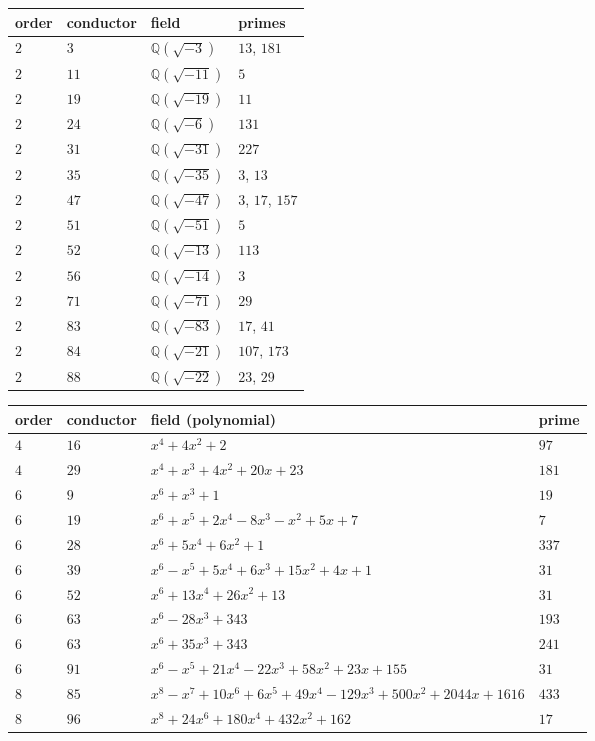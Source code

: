 \documentclass[pdflatex,sn-mathphys-num]{sn-jnl}%
\theoremstyle{plain}
\theoremstyle{definition}
\theoremstyle{remark}
\numberwithin{equation}{section}
\newcommand{\QQ}{\mathbb{Q}}
\begin{document}
\noindent \begin{tabular}{|l|l|l|l|} \hline
order & conductor & field & primes  \\ \hline
$2$ & $3$ & $\QQ(\sqrt{-3})$ & $13 $, $181$ \\ \hline
$2$ & $11$ & $\QQ(\sqrt{-11})$ & $5 $  \\ \hline
$2$ & $19$ & $\QQ(\sqrt{-19})$ & $11 $  \\ \hline
$2$ & $24$ & $\QQ(\sqrt{-6})$ & $131 $  \\ \hline
$2$ & $31$ & $\QQ(\sqrt{-31})$ & $227 $  \\ \hline
$2$ & $35$ & $\QQ(\sqrt{-35})$ & $3$, $13$  \\ \hline
$2$ & $47$ & $\QQ(\sqrt{-47})$ & $3$, $17$, $157$  \\ \hline
$2$ & $51$ & $\QQ(\sqrt{-51})$ & $5 $  \\ \hline
$2$ & $52$ & $\QQ(\sqrt{-13})$ & $113 $  \\ \hline
$2$ & $56$ & $\QQ(\sqrt{-14})$ & $3 $  \\ \hline
$2$ & $71$ & $\QQ(\sqrt{-71})$ & $29 $  \\ \hline
$2$ & $83$ & $\QQ(\sqrt{-83})$ & $17 $, $41$  \\ \hline
$2$ & $84$ & $\QQ(\sqrt{-21})$ & $107 $, $173$  \\ \hline
$2$ & $88$ & $\QQ(\sqrt{-22})$ & $23$, $29$  \\ \hline

\end{tabular}

\bigskip

\noindent \begin{tabular}{|l|l|l|l|} \hline
order & conductor & field (polynomial) & prime\\ \hline
$4$ & $16$ & $x^4 + 4 x^2 + 2$ & $97 $ \\ \hline
$4$ & $29$ & $x^4 + x^3 + 4 x^2 + 20 x + 23$ & $181 $  \\ \hline
\hline
$6$ & $9$ & $x^6 + x^3 + 1$ & $19 $  \\ \hline
$6$ & $19$ & $x^6 + x^5 + 2 x^4 - 8 x^3 - x^2 + 5 x + 7$ & $7 $  \\ \hline
$6$ & $28$ & $x^6 + 5 x^4 + 6 x^2 + 1$ & $337 $  \\ \hline
$6$ & $39$ & $x^6 - x^5 + 5 x^4 + 6 x^3 + 15 x^2 + 4 x + 1$ & $31 $  \\ \hline
$6$ & $52$ & $x^6 + 13 x^4 + 26 x^2 + 13$ & $31 $  \\ \hline
$6$ & $63$ & $x^6 - 28 x^3 + 343$ & $193 $  \\ \hline
$6$ & $63$ & $x^6 + 35 x^3 + 343$ & $241 $  \\ \hline
$6$ & $91$ & $x^6 - x^5 + 21 x^4 - 22 x^3 + 58 x^2 + 23 x + 155$ & $31 $  \\ \hline
\hline
$8$ & $85$ & $x^8 - x^7 + 10 x^6 + 6 x^5 + 49 x^4 - 129 x^3 + 500 x^2 + 2044 x + 1616  $ & $433 $  \\ \hline
$8$ & $96$ & $x^8 + 24 x^6 + 180 x^4 + 432 x^2 + 162$ & $17 $  \\ \hline
\end{tabular}\\
\end{document}
